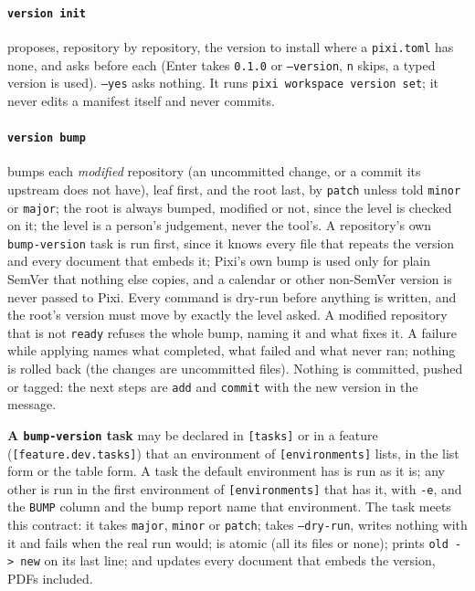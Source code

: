 \paragraph{\texttt{version init}} proposes, repository by repository, the
version to install where a \texttt{pixi.toml} has none, and asks before each
(Enter takes \texttt{0.1.0} or \texttt{--version}, \texttt{n} skips, a typed
version is used). \texttt{--yes} asks nothing. It runs \texttt{pixi
workspace version set}; it never edits a manifest itself and never commits.

\paragraph{\texttt{version bump}} bumps each \emph{modified} repository (an
uncommitted change, or a commit its upstream does not have), leaf first, and
the root last, by \texttt{patch} unless told \texttt{minor} or \texttt{major};
the root is always bumped, modified or not, since the level is checked on it; the level is a person's judgement, never the tool's. A repository's own
\texttt{bump-version} task is run first, since it knows every file that
repeats the version and every document that embeds it; Pixi's own bump is
used only for plain SemVer that nothing else copies, and a calendar or other
non-SemVer version is never passed to Pixi. Every command is dry-run before
anything is written, and the root's version must move by exactly the level
asked. A modified repository that is not \texttt{ready} refuses the whole
bump, naming it and what fixes it. A failure while applying names what
completed, what failed and what never ran; nothing is rolled back (the
changes are uncommitted files). Nothing is committed, pushed or tagged: the
next steps are \texttt{add} and \texttt{commit} with the new version in the
message.

\textbf{A \texttt{bump-version} task} may be declared in \texttt{[tasks]} or in
a feature (\texttt{[feature.dev.tasks]}) that an environment of
\texttt{[environments]} lists, in the list form or the table form. A task the
default environment has is run as it is; any other is run in the first
environment of \texttt{[environments]} that has it, with \texttt{-e}, and the
\texttt{BUMP} column and the bump report name that environment. The task meets
this contract: it takes
\texttt{major}, \texttt{minor} or \texttt{patch}; takes \texttt{--dry-run},
writes nothing with it and fails when the real run would; is atomic (all its
files or none); prints \texttt{old -> new} on its last line; and updates every
document that embeds the version, PDFs included.

